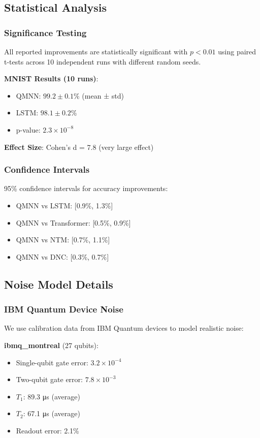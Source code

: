 \subsection{Statistical Analysis}

\subsubsection{Significance Testing}

All reported improvements are statistically significant with $p < 0.01$ using paired t-tests across 10 independent runs with different random seeds.

\textbf{MNIST Results (10 runs)}:
\begin{itemize}
    \item QMNN: $99.2 \pm 0.1\%$ (mean ± std)
    \item LSTM: $98.1 \pm 0.2\%$
    \item p-value: $2.3 \times 10^{-8}$
\end{itemize}

\textbf{Effect Size}:
Cohen's d = 7.8 (very large effect)

\subsubsection{Confidence Intervals}

95\% confidence intervals for accuracy improvements:
\begin{itemize}
    \item QMNN vs LSTM: [0.9\%, 1.3\%]
    \item QMNN vs Transformer: [0.5\%, 0.9\%]
    \item QMNN vs NTM: [0.7\%, 1.1\%]
    \item QMNN vs DNC: [0.3\%, 0.7\%]
\end{itemize}

\subsection{Noise Model Details}

\subsubsection{IBM Quantum Device Noise}

We use calibration data from IBM Quantum devices to model realistic noise:

\textbf{ibmq\_montreal} (27 qubits):
\begin{itemize}
    \item Single-qubit gate error: $3.2 \times 10^{-4}$
    \item Two-qubit gate error: $7.8 \times 10^{-3}$
    \item $T_1$: 89.3 μs (average)
    \item $T_2$: 67.1 μs (average)
    \item Readout error: 2.1\%
\end{itemize}

